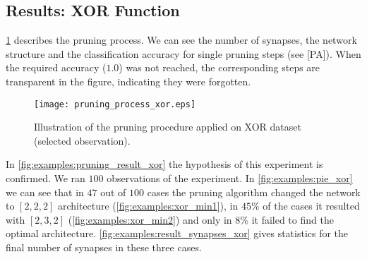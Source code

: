 \begin{table}[H]
\centering
{}
\caption{Experiment settings for the XOR example.}
\label{tab:examples:xor_settings}
\end{table}

\subsection*{Results: XOR Function}
\cref{fig:examples:pruning_process_xor} describes the pruning process. We can see the number of synapses, the network structure and the classification accuracy for single pruning steps (see [PA]). When the required accuracy ($ 1.0 $) was not reached, the corresponding steps are transparent in the figure, indicating they were forgotten.

\begin{figure}[H]
\centering
\texttt{[image: pruning\_process\_xor.eps]}
\caption{Illustration of the pruning procedure applied on XOR dataset (selected observation).}
\label{fig:examples:pruning_process_xor}
\end{figure}

In \cref{fig:examples:pruning_result_xor} the hypothesis of this experiment is confirmed. We ran $ 100 $ observations of the experiment. In \cref{fig:examples:pie_xor} we can see that in $ 47 $ out of $ 100 $ cases the pruning algorithm changed the network to $ [2, 2, 2] $ architecture (\cref{fig:examples:xor_min1}), in $ 45\% $ of the cases it resulted with $ [2, 3, 2] $ (\cref{fig:examples:xor_min2}) and only in $ 8\% $ it failed to find the optimal architecture. \cref{fig:examples:result_synapses_xor} gives statistics for the final number of synapses in these three cases.

